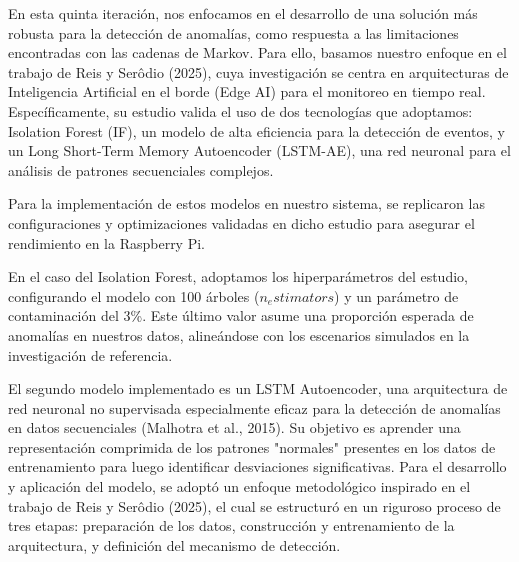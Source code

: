 \begin{enumerate}
        En esta quinta iteración, nos enfocamos en el desarrollo de una solución más robusta para la detección de anomalías, como respuesta a las limitaciones encontradas con las cadenas de Markov. Para ello, basamos nuestro enfoque en el trabajo de Reis y Serôdio (2025), cuya investigación se centra en arquitecturas de Inteligencia Artificial en el borde (Edge AI) para el monitoreo en tiempo real. Específicamente, su estudio valida el uso de dos tecnologías que adoptamos: Isolation Forest (IF), un modelo de alta eficiencia para la detección de eventos, y un Long Short-Term Memory Autoencoder (LSTM-AE), una red neuronal para el análisis de patrones secuenciales complejos.

        Para la implementación de estos modelos en nuestro sistema, se replicaron las configuraciones y optimizaciones validadas en dicho estudio para asegurar el rendimiento en la Raspberry Pi.

        En el caso del Isolation Forest, adoptamos los hiperparámetros del estudio, configurando el modelo con 100 árboles ($n_estimators$) y un parámetro de contaminación del 3\%. Este último valor asume una proporción esperada de anomalías en nuestros datos, alineándose con los escenarios simulados en la investigación de referencia.

        El segundo modelo implementado es un LSTM Autoencoder, una arquitectura de red neuronal no supervisada especialmente eficaz para la detección de anomalías en datos secuenciales (Malhotra et al., 2015). Su objetivo es aprender una representación comprimida de los patrones "normales" presentes en los datos de entrenamiento para luego identificar desviaciones significativas.
        Para el desarrollo y aplicación del modelo, se adoptó un enfoque metodológico inspirado en el trabajo de Reis y Serôdio (2025), el cual se estructuró en un riguroso proceso de tres etapas: preparación de los datos, construcción y entrenamiento de la arquitectura, y definición del mecanismo de detección.


\end{enumerate}
